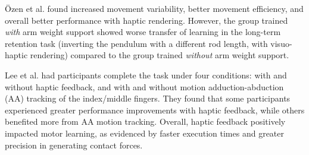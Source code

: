 Özen et al. found increased movement variability, better movement efficiency, and overall better performance with haptic rendering. However, the group trained \textit{with} arm weight support showed worse transfer of learning in the long-term retention task (inverting the pendulum with a different rod length, with visuo-haptic rendering) compared to the group trained \textit{without} arm weight support.

Lee et al. had participants complete the task under four conditions: with and without haptic feedback, and with and without motion adduction-abduction (AA) tracking of the index/middle fingers. They found that some participants experienced greater performance improvements with haptic feedback, while others benefited more from AA motion tracking. Overall, haptic feedback positively impacted motor learning, as evidenced by faster execution times and greater precision in generating contact forces.

